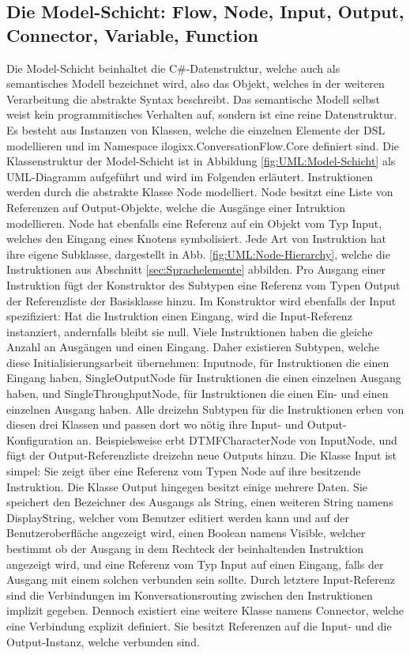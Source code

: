 \subsection[Die Model-Schicht]{Die Model-Schicht: Flow, Node, Input, Output, Connector, Variable, Function}
\label{subsec:Die Model-Schicht}
Die Model-Schicht beinhaltet die C\#-Datenstruktur, welche auch als semantisches Modell bezeichnet wird, also das Objekt, welches in der weiteren Verarbeitung die abstrakte Syntax beschreibt. Das semantische Modell selbst weist kein programmitisches Verhalten auf, sondern ist eine reine Datenstruktur. Es besteht aus Instanzen von Klassen, welche die einzelnen Elemente der DSL modellieren und im Namespace ilogixx.ConversationFlow.Core definiert sind. Die Klassenstruktur der Model-Schicht ist in Abbildung \ref{fig:UML:Model-Schicht} als UML-Diagramm aufgeführt und wird im Folgenden erläutert.
\newline
Instruktionen werden durch die abstrakte Klasse Node modelliert. Node besitzt eine Liste von Referenzen auf Output-Objekte, welche die Ausgänge einer Intruktion modellieren. Node hat ebenfalls eine Referenz auf ein Objekt vom Typ Input, welches den Eingang eines Knotens symbolisiert. Jede Art von Instruktion hat ihre eigene Subklasse, dargestellt in Abb. \ref{fig:UML:Node-Hierarchy}, welche die Instruktionen aus Abschnitt \ref{sec:Sprachelemente} abbilden. Pro Ausgang einer Instruktion fügt der Konstruktor des Subtypen eine Referenz vom Typen Output der Referenzliste der Basisklasse hinzu. Im Konstruktor wird ebenfalls der Input spezifiziert: Hat die Instruktion einen Eingang, wird die Input-Referenz instanziert, andernfalls bleibt sie null. Viele Instruktionen haben die gleiche Anzahl an Ausgängen und einen Eingang. Daher existieren Subtypen, welche diese Initialisierungsarbeit übernehmen: Inputnode, für Instruktionen die einen Eingang haben, SingleOutputNode für Instruktionen die einen einzelnen Ausgang haben, und SingleThroughputNode, für Instruktionen die einen Ein- und einen einzelnen Ausgang haben. Alle dreizehn Subtypen für die Instruktionen erben von diesen drei Klassen und passen dort wo nötig ihre Input- und Output-Konfiguration an. Beispielsweise erbt DTMFCharacterNode von InputNode, und fügt der Output-Referenzliste dreizehn neue Outputs hinzu.
\newline
Die Klasse Input ist simpel: Sie zeigt über eine Referenz vom Typen Node auf ihre besitzende Instruktion. Die Klasse Output hingegen besitzt einige mehrere Daten. Sie speichert den Bezeichner des Ausgangs als String, einen weiteren String namens DisplayString, welcher vom Benutzer editiert werden kann und auf der Benutzeroberfläche angezeigt wird, einen Boolean namens Visible, welcher bestimmt ob der Ausgang in dem Rechteck der beinhaltenden Instruktion angezeigt wird, und eine Referenz vom Typ Input auf einen Eingang, falls der Ausgang mit einem solchen verbunden sein sollte. Durch letztere Input-Referenz sind die Verbindungen im Konversationsrouting zwischen den Instruktionen implizit gegeben. Dennoch existiert eine weitere Klasse namens Connector, welche eine Verbindung explizit definiert. Sie besitzt Referenzen auf die Input- und die Output-Instanz, welche verbunden sind.
